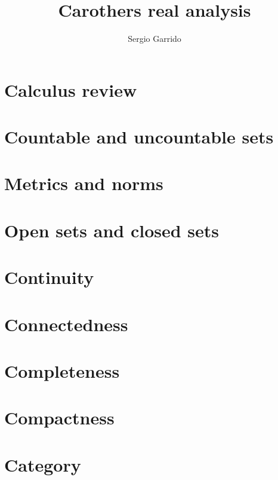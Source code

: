 \documentclass{bookSolutions}
\title{Carothers real analysis}
\author{Sergio Garrido}
\begin{document}
\maketitle

\tableofcontents

\section{Calculus review}



\section{Countable and uncountable sets}




\section{Metrics and norms}





\section{Open sets and closed sets}




\section{Continuity}




\section{Connectedness}

\section{Completeness}

\section{Compactness}

\section{Category}
\end{document}
